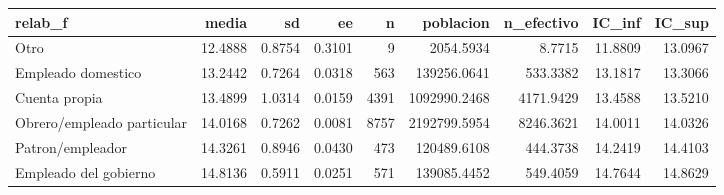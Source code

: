\begin{tabular}{lrrrrrrrr}
\toprule
relab\_f & media & sd & ee & n & poblacion & n\_efectivo & IC\_inf & IC\_sup \\
\midrule
Otro & 12.4888 & 0.8754 & 0.3101 & 9 & 2054.5934 & 8.7715 & 11.8809 & 13.0967 \\
Empleado domestico & 13.2442 & 0.7264 & 0.0318 & 563 & 139256.0641 & 533.3382 & 13.1817 & 13.3066 \\
Cuenta propia & 13.4899 & 1.0314 & 0.0159 & 4391 & 1092990.2468 & 4171.9429 & 13.4588 & 13.5210 \\
Obrero/empleado particular & 14.0168 & 0.7262 & 0.0081 & 8757 & 2192799.5954 & 8246.3621 & 14.0011 & 14.0326 \\
Patron/empleador & 14.3261 & 0.8946 & 0.0430 & 473 & 120489.6108 & 444.3738 & 14.2419 & 14.4103 \\
Empleado del gobierno & 14.8136 & 0.5911 & 0.0251 & 571 & 139085.4452 & 549.4059 & 14.7644 & 14.8629 \\
\bottomrule
\end{tabular}
